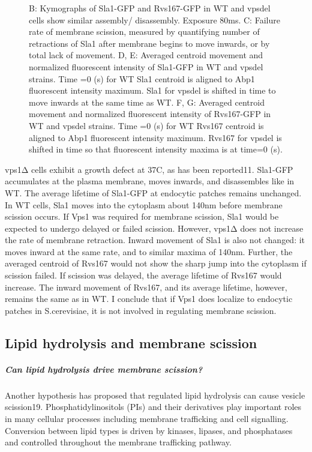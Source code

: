 \begin{figure}
{{	B: Kymographs of Sla1-GFP and Rvs167-GFP in WT and vpsdel cells show similar assembly/ disassembly. Exposure 80ms.  
	C: Failure rate of membrane scission, measured by quantifying number of retractions of Sla1 after membrane begins to move inwards, or by total lack of movement. 
	D, E: Averaged centroid movement and normalized fluorescent intensity of Sla1-GFP in WT and vpsdel strains. Time =0 (s) for WT Sla1 centroid is aligned to Abp1 fluorescent intensity maximum. Sla1 for vpsdel is shifted in time to move inwards at the same time as WT. 
	F, G: Averaged centroid movement and normalized fluorescent intensity of Rvs167-GFP in WT and vpsdel strains. Time =0 (s) for WT Rvs167 centroid is aligned to Abp1 fluorescent intensity maximum. Rvs167 for vpsdel is shifted in time so that fluorescent intensity maxima is at time=0 (s).}
	\label{fig3_vpsdel}}
	\end{figure}

	
	\vspace{5mm}
	vps1Δ cells exhibit a growth defect at 37C, as has been reported11. Sla1-GFP accumulates at the plasma membrane, moves inwards, and disassembles like in WT. The average lifetime of Sla1-GFP at endocytic patches remains unchanged. In WT cells, Sla1 moves into the cytoplasm about 140nm before membrane scission occurs. If Vps1 was required for membrane scission, Sla1 would be expected to undergo delayed or failed scission. However, vps1Δ does not increase the rate of membrane retraction. Inward movement of Sla1 is also not changed: it moves inward at the same rate, and to similar maxima of 140nm. Further, the averaged centroid of Rvs167 would not show the sharp jump into the cytoplasm if scission failed. If scission was delayed, the average lifetime of Rvs167 would increase. The inward movement of Rvs167, and its average lifetime, however, remains the same as in WT. I conclude that if Vps1 does localize to endocytic patches in S.cerevisiae, it is not involved in regulating membrane scission.  


	\subsection{Lipid hydrolysis and membrane scission}
	
	\subparagraph{Can lipid hydrolysis drive membrane scission?}
	Another hypothesis has proposed that regulated lipid hydrolysis can cause vesicle scission19. Phosphatidylinositols (PIs) and their derivatives play important roles in many cellular processes including membrane trafficking and cell signalling. Conversion between lipid types is driven by kinases, lipases, and phosphatases and controlled throughout the membrane trafficking pathway. 
	
